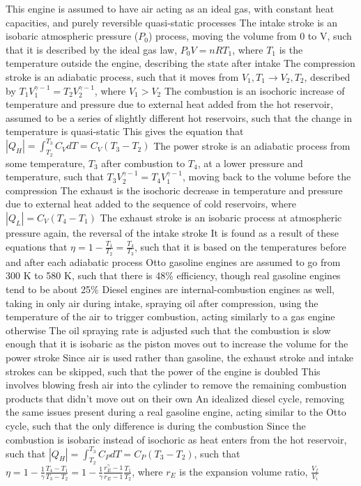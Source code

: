 \documentclass[11 pt, twoside]{article}
\newenvironment{outline*}
{
	\begin{outline}[enumerate]
	}
	{\end{outline}
}
\begin{document}
\begin{outline*}
\2 This engine is assumed to have air acting as an ideal gas, with constant heat capacities, and purely reversible quasi-static processes
\2 The intake stroke is an isobaric atmospheric pressure ($P_0$) process, moving the volume from 0 to V, such that it is described by the ideal gas law, $P_0V = nRT_1$, where $T_1$ is the temperature outside the engine, describing the state after intake
\2 The compression stroke is an adiabatic process, such that it moves from $V_1, T_1 \to V_2, T_2$, described by $T_1V_1^{\gamma - 1} = T_2V_2^{\gamma - 1}$, where $V_1 > V_2$
\2 The combustion is an isochoric increase of temperature and pressure due to external heat added from the hot reservoir, assumed to be a series of slightly different hot reservoirs, such that the change in temperature is quasi-static
\3 This gives the equation that $|Q_H| = \int^{T_3}_{T_2}C_VdT = C_V(T_3 - T_2)$
\2 The power stroke is an adiabatic process from some temperature, $T_3$ after combustion to $T_4$, at a lower pressure and temperature, such that $T_3V_2^{\gamma - 1} = T_4V_1^{\gamma - 1}$, moving back to the volume before the compression
\2 The exhaust is the isochoric decrease in temperature and pressure due to external heat added to the sequence of cold reservoirs, where $|Q_L| = C_V(T_4 - T_1)$
\2 The exhaust stroke is an isobaric process at atmospheric pressure again, the reversal of the intake stroke
\2 It is found as a result of these equations that $\eta = 1 - \frac{T_1}{T_2} = \frac{T_4}{T_3}$, such that it is based on the temperatures before and after each adiabatic process
\3 Otto gasoline engines are assumed to go from 300 K to 580 K, such that there is 48\% efficiency, though real gasoline engines tend to be about 25\%
\1 Diesel engines are internal-combustion engines as well, taking in only air during intake, spraying oil after compression, using the temperature of the air to trigger combustion, acting similarly to a gas engine otherwise
\2 The oil spraying rate is adjusted such that the combustion is slow enough that it is isobaric as the piston moves out to increase the volume for the power stroke
\2 Since air is used rather than gasoline, the exhaust stroke and intake strokes can be skipped,  such that the power of the engine is doubled
\3 This involves blowing fresh air into the cylinder to remove the remaining combustion products that didn't move out on their own
\2 An idealized diesel cycle, removing the same issues present during a real gasoline engine, acting similar to the Otto cycle, such that the only difference is during the combustion
\3 Since the combustion is isobaric instead of isochoric as heat enters from the hot reservoir, such that $|Q_H| = \int^{T_3}_{T_2} C_P dT = C_P(T_3 - T_2)$, such that $\eta = 1 - \frac{1}{\gamma}\frac{T_4 - T_1}{T_3 - T_2} = 1 - \frac{1}{\gamma}\frac{r^\gamma_E - 1}{r_E - 1}\frac{T_1}{T_2}$, where $r_E$ is the expansion volume ratio, $\frac{V_f}{V_i}$

\end{outline*}
\end{document}

